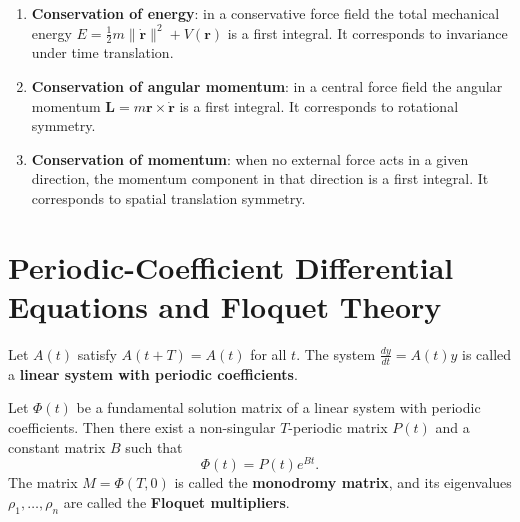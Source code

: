 \begin{example}\label{ex:classical_first_integrals}
\begin{enumerate}[label=(\roman*)]
    \item \textbf{Conservation of energy}: in a conservative force field the total mechanical energy $E = \frac{1}{2}m\|\dot{\mathbf{r}}\|^2 + V(\mathbf{r})$ is a first integral. It corresponds to invariance under time translation.
    \item \textbf{Conservation of angular momentum}: in a central force field the angular momentum $\mathbf{L} = m \mathbf{r} \times \dot{\mathbf{r}}$ is a first integral. It corresponds to rotational symmetry.
    \item \textbf{Conservation of momentum}: when no external force acts in a given direction, the momentum component in that direction is a first integral. It corresponds to spatial translation symmetry.
\end{enumerate}
\end{example}

\section{Periodic-Coefficient Differential Equations and Floquet Theory}\label{sec:floquet}

\begin{definition}\label{def:periodic_coefficient_system}
Let $A(t)$ satisfy $A(t+T) = A(t)$ for all $t$. The system $\frac{dy}{dt} = A(t) y$ is called a \textbf{linear system with periodic coefficients}.
\end{definition}

\begin{theorem}\label{thm:floquet}
Let $\Phi(t)$ be a fundamental solution matrix of a linear system with periodic coefficients. Then there exist a non-singular $T$-periodic matrix $P(t)$ and a constant matrix $B$ such that
\[
\Phi(t) = P(t) e^{Bt}.
\]
The matrix $M = \Phi(T, 0)$ is called the \textbf{monodromy matrix}, and its eigenvalues $\rho_1, \dots, \rho_n$ are called the \textbf{Floquet multipliers}.
\end{theorem}


